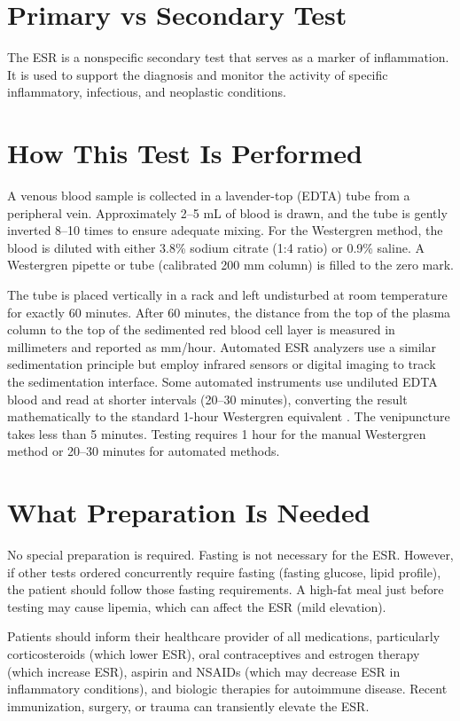 \section*{Primary vs Secondary Test}
The ESR is a nonspecific secondary test that serves as a marker of inflammation. It is used to support the diagnosis and monitor the activity of specific inflammatory, infectious, and neoplastic conditions.

\section*{How This Test Is Performed}
A venous blood sample is collected in a lavender-top (EDTA) tube from a peripheral vein. Approximately 2--5 mL of blood is drawn, and the tube is gently inverted 8--10 times to ensure adequate mixing. For the Westergren method, the blood is diluted with either 3.8\% sodium citrate (1:4 ratio) or 0.9\% saline. A Westergren pipette or tube (calibrated 200 mm column) is filled to the zero mark.

The tube is placed vertically in a rack and left undisturbed at room temperature for exactly 60 minutes. After 60 minutes, the distance from the top of the plasma column to the top of the sedimented red blood cell layer is measured in millimeters and reported as mm/hour. Automated ESR analyzers use a similar sedimentation principle but employ infrared sensors or digital imaging to track the sedimentation interface. Some automated instruments use undiluted EDTA blood and read at shorter intervals (20--30 minutes), converting the result mathematically to the standard 1-hour Westergren equivalent \cite{fischbach2023manual}. The venipuncture takes less than 5 minutes. Testing requires 1 hour for the manual Westergren method or 20--30 minutes for automated methods.

\section*{What Preparation Is Needed}
No special preparation is required. Fasting is not necessary for the ESR. However, if other tests ordered concurrently require fasting (fasting glucose, lipid profile), the patient should follow those fasting requirements. A high-fat meal just before testing may cause lipemia, which can affect the ESR (mild elevation).

Patients should inform their healthcare provider of all medications, particularly corticosteroids (which lower ESR), oral contraceptives and estrogen therapy (which increase ESR), aspirin and NSAIDs (which may decrease ESR in inflammatory conditions), and biologic therapies for autoimmune disease. Recent immunization, surgery, or trauma can transiently elevate the ESR.

